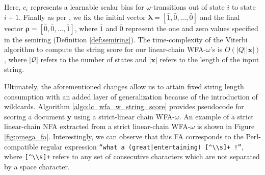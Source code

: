 Here, $c_i$ represents a learnable scalar bias for $\omega$-transitions out of
state $i$ to state $i+1$. Finally as per \citet{schwartz2018sopa}, we fix the
initial vector $\bm{\lambda} = [\bar{1}, \bar{0}, \ldots, \bar{0}]$ and the final
vector $\bm{\rho} = [\bar{0}, \bar{0}, \ldots, \bar{1}]$, where $\bar{1}$ and
$\bar{0}$ represent the one and zero values specified in the semiring
(Definition \ref{def:semiring}). The time-complexity of the Viterbi algorithm to
compute the string score for our linear-chain WFA-$\omega$'s is
$O(|Q||\bm{x}|)$, where $|\mathcal{Q}|$ refers to the number of states and
$|\bm{x}|$ refers to the length of the input string.

Ultimately, the aforementioned changes allow us to attain fixed string length
consumption with an added layer of generalization because of the introduction of
wildcards. Algorithm \ref{algo:lc_wfa_w_string_score} provides pseudocode for
scoring a document $\bm{y}$ using a strict-linear chain WFA-$\omega$. An example
of a strict linear-chain NFA extracted from a strict linear-chain WFA-$\omega$
is shown in Figure \ref{fig:omega_fa}. Interestingly, we can observe that this
FA corresponds to the Perl-compatible regular expression \texttt{``what a
  (great|entertaining) [\^{}\textbackslash\textbackslash s]+ !''}, where
\texttt{[\^{}\textbackslash\textbackslash s]+} refers to any set of consecutive
characters which are not separated by a space character.

